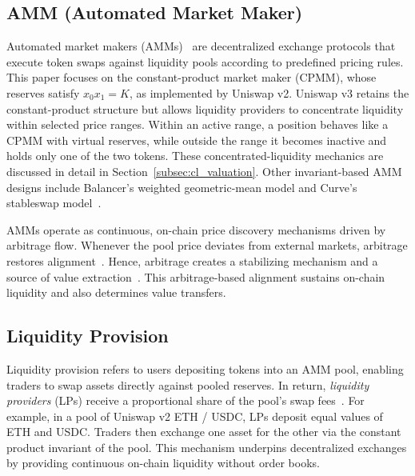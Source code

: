 \documentclass[10pt,conference,compsocconf]{IEEEtran}
\begin{document}
\subsection{AMM (Automated Market Maker)}
Automated market makers (AMMs)~\cite{hertzog2017bancor} are decentralized exchange protocols that execute token swaps against liquidity pools according to predefined pricing rules. This paper focuses on the constant-product market maker (CPMM), whose reserves satisfy $x_0x_1=K$, as implemented by Uniswap v2. Uniswap v3 retains the constant-product structure but allows liquidity providers to concentrate liquidity within selected price ranges. Within an active range, a position behaves like a CPMM with virtual reserves, while outside the range it becomes inactive and holds only one of the two tokens. These concentrated-liquidity mechanics are discussed in detail in Section~\ref{subsec:cl_valuation}. Other invariant-based AMM designs include Balancer's weighted geometric-mean model and Curve's stableswap model~\cite{bartoletti2022theory}.

AMMs operate as continuous, on-chain price discovery mechanisms driven by arbitrage flow. Whenever the pool price deviates from external markets, arbitrage restores alignment~\cite{angeris2020improved}. 
Hence, arbitrage creates a stabilizing mechanism and a source of value extraction~\cite{pusceddu2024lean}.
This arbitrage-based alignment sustains on-chain liquidity and also determines value transfers. %

\subsection{Liquidity Provision}
\label{sec:liquidity-provision}

Liquidity provision refers to users depositing tokens into an AMM pool, enabling traders to swap assets directly against pooled reserves. In return, \textit{liquidity providers} (LPs) receive a proportional share of the pool’s swap fees~\cite{gogol2024sok, chiu2023fragility, saengchote2023decentralized}.
For example, in a pool of Uniswap v2 ETH / USDC, LPs deposit equal values of ETH and USDC. Traders then exchange one asset for the other via the constant product invariant of the pool. This mechanism underpins decentralized exchanges by providing continuous on-chain liquidity without order books.
\end{document}
